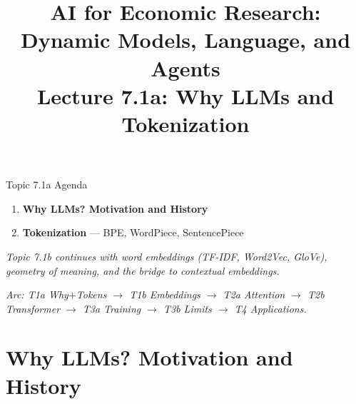 


\graphicspath{{./pic/}{../../MiniCourse_8hr/Slides/Module3_LLM_Text/pic/}{../}}

\usetikzlibrary{arrows.meta,positioning,shapes,calc,fit,backgrounds}

\title[AI for Econ Research]{AI for Economic Research: Dynamic Models, Language, and Agents\\
Lecture 7.1a: Why LLMs and Tokenization}



\makebeamertitle

\begin{frame}{Topic 7.1a Agenda}
\begin{enumerate}
  \item \textbf{Why LLMs? Motivation and History}
  \medskip
  \item \textbf{Tokenization} --- BPE, WordPiece, SentencePiece
\end{enumerate}

\bigskip
\textit{Topic 7.1b continues with word embeddings (TF-IDF, Word2Vec, GloVe), geometry of meaning, and the bridge to contextual embeddings.}

\medskip
\footnotesize\textit{Arc: T1a Why$+$Tokens $\to$ T1b Embeddings $\to$ T2a Attention $\to$ T2b Transformer $\to$ T3a Training $\to$ T3b Limits $\to$ T4 Applications.}
\end{frame}

\section{Why LLMs? Motivation and History}

